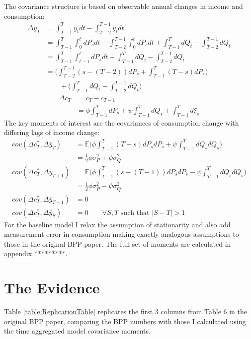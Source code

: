 \documentclass[titlepage]{\econtex}\newcommand{\texname}{BPP_PSID_TimeAgg}
\begin{document}
The covariance structure is based on observable annual changes in income and consumption:
\begin{align}
\Delta \bar{y}_T &= \int_{T-1}^{T} y_t dt - \int_{T-2}^{T-1} y_t dt \nonumber \\ 
&= \int_{T-1}^{T} \int_{0}^{t}dP_s dt -\int_{T-2}^{T-1} \int_{0}^{t}dP_s dt +  \int_{T-1}^{T} dQ_t -\int_{T-2}^{T-1} dQ_t \nonumber \\
&= \int_{T-1}^{T} \int_{t-1}^{t}dP_s dt +  \int_{T-1}^{T} dQ_t -\int_{T-2}^{T-1} dQ_t \nonumber \\
&= \Big(\int_{T-2}^{T-1} (s-(T-2))dP_s  + \int_{T-1}^{T} (T-s)dP_s \Big) \nonumber \\
& \qquad + \Big(\int_{T-1}^{T} dQ_t -\int_{T-2}^{T-1} dQ_t \Big) \label{deltay}
\end{align}
\begin{align}
\Delta c_T &= c_T - c_{T-1} \nonumber  \\
&= \phi  \int_{T-1}^{T} dP_s  +\psi \int_{T-1}^{T}dQ_s +\int_{T-1}^{T}d\xi_s  \label{deltac}
\end{align}
The key moments of interest are the covariances of consumption change with differing lags of income change:
\begin{align}
cov(\Delta c_T^*, \Delta \bar{y}_T) &=  \mathbb{E} \Big( \phi \int_{T-1}^{T} (T-s) dP_s dP_s + \psi \int_{T-1}^{T} dQ_s dQ_s \Big) \nonumber \\
&= \frac{1}{2} \phi \sigma^2_P + \psi \sigma^2_Q \\
cov(\Delta c_T^*, \Delta \bar{y}_{T+1}) &=  \mathbb{E} \Big( \phi \int_{T-1}^{T} (s-(T-1)) dP_s dP_s - \psi \int_{T-1}^{T} dQ_s dQ_s \Big) \nonumber \\
&= \frac{1}{2} \phi \sigma^2_P - \psi \sigma^2_Q \\
cov(\Delta c_T^*, \Delta \bar{y}_{T-1}) &= 0 \\
cov(\Delta c_T^*, \Delta \bar{y}_{S}) &= 0 \qquad \forall S,T \text{ such that }|S-T| >1 
\end{align}
For the baseline model I relax the assumption of stationarity and also add measurement error in consumption making exactly analogous assumptions to those in the original BPP paper. The full set of moments are calculated in appendix *********.
\section{The Evidence}
Table \ref{table:ReplicationTable} replicates the first 3 columns from Table 6 in the original BPP paper, comparing the BPP numbers with those I calculated using the time aggregated model covariance moments.
\end{document}
